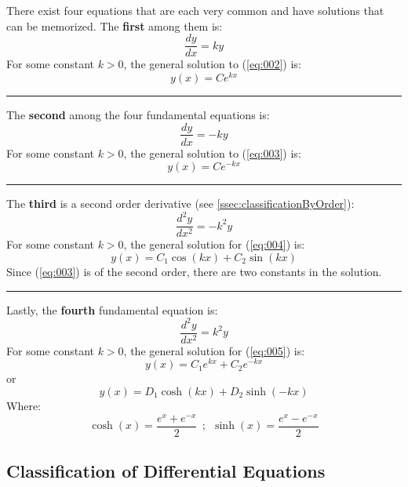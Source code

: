 \documentclass[12pt]{article}
\begin{document}
There exist four equations that are each very common and have solutions that can be memorized. The \textbf{first} among them is:
\begin{equation}
  \frac{dy}{dx} = ky
  \label{eq:002}
\end{equation}
For some constant $k>0$, the general solution to (\ref{eq:002}) is:
\begin{equation*}
  y(x) = Ce^{kx}
\end{equation*}
\hrule
The \textbf{second} among the four fundamental equations is:
\begin{equation}
  \frac{dy}{dx} = -ky
  \label{eq:003}
\end{equation}
For some constant $k>0$, the general solution to (\ref{eq:003}) is:
\begin{equation*}
  y(x) = Ce^{-kx}
\end{equation*}
\hrule
The \textbf{third} is a second order derivative (see \ref{ssec:classificationByOrder}):
\begin{equation}
  \frac{d^2y}{dx^2} = -k^2y
  \label{eq:004}
\end{equation}
For some constant $k>0$, the general solution for (\ref{eq:004}) is:
\begin{equation*}
  y(x) = C_1\cos(kx) + C_2\sin(kx)
\end{equation*}
Since (\ref{eq:003}) is of the second order, there are two constants in the solution.
\vspace{08pt}
\hrule
Lastly, the \textbf{fourth} fundamental equation is:
\begin{equation}
  \frac{d^2y}{dx^2} = k^2y
  \label{eq:005}
\end{equation}
For some constant $k>0$, the general solution for (\ref{eq:005}) is:
\begin{equation*}
  y(x) = C_1e^{kx} + C_2e^{-kx}
\end{equation*}
or
\begin{equation*}
  y(x) = D_1\cosh(kx) + D_2\sinh(-kx)
\end{equation*}
Where:
\begin{equation*}
  \cosh(x) = \frac{e^x+e^{-x}}{2}\ \ ;\ \ \sinh(x) = \frac{e^x-e^{-x}}{2}
\end{equation*}


\subsection{Classification of Differential Equations}
\label{ssec:classificationOfDifferentialEquations}
\end{document}
